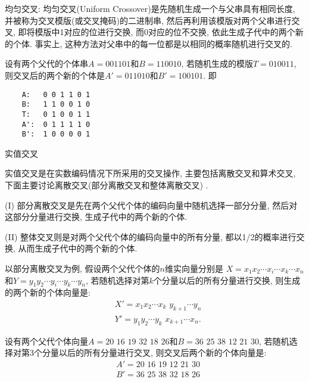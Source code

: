  均匀交叉: 均匀交叉(Uniform Crossover)是先随机生成一个与父串具有相同长度, 并被称为交叉模版(或交叉掩码)的二进制串, 然后再利用该模版对两个父串进行交叉, 即将模版中1对应的位进行交换, 而0对应的位不交换, 依此生成子代中的两个新的个体.
事实上, 这种方法对父串中的每一位都是以相同的概率随机进行交叉的.

\begin{example}
设有两个父代的个体串$A=001101$和$B=110010$, 若随机生成的模版$T=010011$, 则交叉后的两个新的个体是$A'=011010$和$B'=100101$. 即
\begin{center}
\begin{Verbatim}
    A:   0 0 1 1 0 1
    B:   1 1 0 0 1 0
    T:   0 1 0 0 1 1
    A':  0 1 1 1 1 0
    B':  1 0 0 0 0 1
\end{Verbatim}
\end{center}

     实值交叉

实值交叉是在实数编码情况下所采用的交叉操作, 主要包括离散交叉和算术交叉, 下面主要讨论离散交叉(部分离散交叉和整体离散交叉) .

(I) 部分离散交叉是先在两个父代个体的编码向量中随机选择一部分分量, 然后对这部分分量进行交换, 生成子代中的两个新的个体.

(II) 整体交叉则是对两个父代个体的编码向量中的所有分量, 都以1/2的概率进行交换, 从而生成子代中的两个新的个体.
\end{example}

以部分离散交叉为例, 假设两个父代个体的$n$维实向量分别是 $X=x_1x_2\cdots x_i\cdots x_k\cdots x_n$和$Y=y_1 y_2\cdots y_i \cdots y_k \cdots y_n$, 若随机选择对第$k$个分量以后的所有分量进行交换, 则生成的两个新的个体向量是:
\begin{align*}
  &X'= x_1 x_2 \cdots x_k\,\, y_{k+1} \cdots y_n\\
  &Y'= y_1 y_2 \cdots y_k\,\, x_{k+1} \cdots x_n.
\end{align*}

\begin{example}
设有两个父代个体向量$A=20\,\,  16\,\,  19\,\,  32 \,\, 18 \,\, 26$和$B=36\,\,  25\,\,  38\,\,  12\,\,  21\,\,  30$, 若随机选择对第3个分量以后的所有分量进行交叉, 则交叉后两个新的个体向量是:
\begin{align}
  &A'= 20\,\, 16\,\,  19\,\,  12\,\,  21\,\,  30\\
  &B'= 36\,\,  25\,\,  38\,\,  32\,\,  18\,\,  26
\end{align}
\vspace{-0.4cm}
\end{example}

